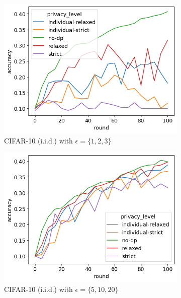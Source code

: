 \begin{figure}[tb]
	\centering
	\begin{subfigure}{0.45\textwidth}
		\centering
		\includegraphics[width=\linewidth]{Bilder/cifar10-accuracy-iid-eps-1-2-3.png}
		\caption{CIFAR-10 (i.i.d.) with $\epsilon = \{1,2,3\}$}
	\end{subfigure}
	\begin{subfigure}{0.45\textwidth}
		\centering
		\includegraphics[width=\linewidth]{Bilder/cifar10-accuracy-iid-eps-5-10-20.png}
		\caption{CIFAR-10 (i.i.d.) with $\epsilon = \{5,10,20\}$}
	\end{subfigure}
	\begin{subfigure}{0.45\textwidth}
		\centering

\end{subfigure}
\end{figure}
